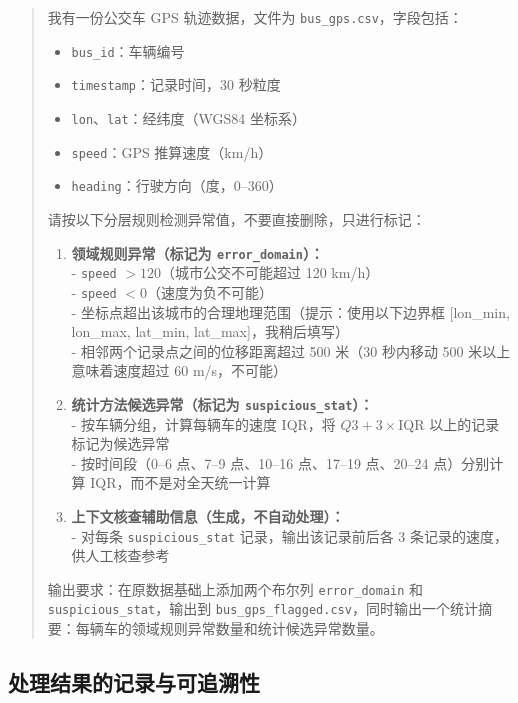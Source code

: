 \begin{quote}
我有一份公交车 GPS 轨迹数据，文件为 \texttt{bus\_gps.csv}，字段包括：

\begin{itemize}
  \item \texttt{bus\_id}：车辆编号
  \item \texttt{timestamp}：记录时间，30 秒粒度
  \item \texttt{lon}、\texttt{lat}：经纬度（WGS84 坐标系）
  \item \texttt{speed}：GPS 推算速度（km/h）
  \item \texttt{heading}：行驶方向（度，0--360）
\end{itemize}

请按以下分层规则检测异常值，不要直接删除，只进行标记：

\begin{enumerate}
  \item \textbf{领域规则异常（标记为 \texttt{error\_domain}）：}\\
    - \texttt{speed} $> 120$（城市公交不可能超过 120 km/h）\\
    - \texttt{speed} $< 0$（速度为负不可能）\\
    - 坐标点超出该城市的合理地理范围（提示：使用以下边界框 [lon\_min, lon\_max, lat\_min, lat\_max]，我稍后填写）\\
    - 相邻两个记录点之间的位移距离超过 500 米（30 秒内移动 500 米以上意味着速度超过 60 m/s，不可能）

  \item \textbf{统计方法候选异常（标记为 \texttt{suspicious\_stat}）：}\\
    - 按车辆分组，计算每辆车的速度 IQR，将 $Q3 + 3 \times \text{IQR}$ 以上的记录标记为候选异常\\
    - 按时间段（0--6 点、7--9 点、10--16 点、17--19 点、20--24 点）分别计算 IQR，而不是对全天统一计算

  \item \textbf{上下文核查辅助信息（生成，不自动处理）：}\\
    - 对每条 \texttt{suspicious\_stat} 记录，输出该记录前后各 3 条记录的速度，供人工核查参考
\end{enumerate}

输出要求：在原数据基础上添加两个布尔列 \texttt{error\_domain} 和 \texttt{suspicious\_stat}，输出到 \texttt{bus\_gps\_flagged.csv}，同时输出一个统计摘要：每辆车的领域规则异常数量和统计候选异常数量。
\end{quote}

\subsection{处理结果的记录与可追溯性}

